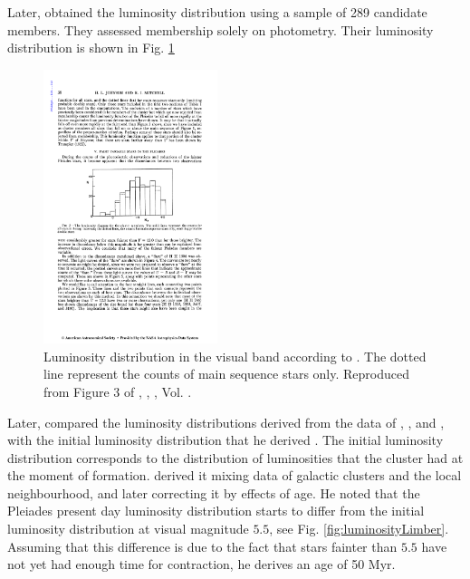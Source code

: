 Later, \citet{Johnson1958} obtained the luminosity distribution using a sample of 289 candidate members. They assessed  membership solely on photometry. Their luminosity distribution is shown in Fig. \ref{fig:luminosityJohnson}

\begin{figure}[ht!]
\begin{center}
\includegraphics[height=8cm]{background/Figures/F3_Johnson1958.pdf}
\caption{Luminosity distribution in the visual band according to \citet{Johnson1958}. The dotted line represent the counts of main sequence stars only. Reproduced from Figure 3 of \citet{Johnson1958}, \textit{}, , Vol. .}
\label{fig:luminosityJohnson}
\end{center}
\end{figure}

Later, \citet{Limber1962} compared the luminosity distributions derived from the data of \citet{Trumpler1921}, \citet{Hertzsprung1947}, and \citet{Johnson1958}, with the initial luminosity distribution that he derived \citep{Limber1960}. The initial luminosity distribution corresponds to the distribution of luminosities that the cluster had at the moment of formation. \citet{Limber1960} derived it mixing data of galactic clusters and the local neighbourhood, and later correcting it by effects of age. He noted that the Pleiades present day luminosity distribution starts to differ from the initial luminosity distribution at visual magnitude $5.5$, see Fig. \ref{fig:luminosityLimber}. Assuming that this difference is due to the fact that stars fainter than $5.5$ have not yet had enough time for contraction, he derives an age of 50 Myr. 

